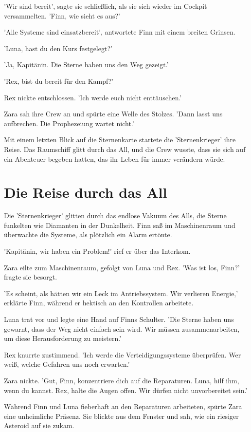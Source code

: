 \documentclass[12pt]{article}
\begin{document}
'Wir sind bereit', sagte sie schließlich, als sie sich wieder im Cockpit versammelten. 'Finn, wie sieht es aus?'

'Alle Systeme sind einsatzbereit', antwortete Finn mit einem breiten Grinsen.

'Luna, hast du den Kurs festgelegt?'

'Ja, Kapitänin. Die Sterne haben uns den Weg gezeigt.'

'Rex, bist du bereit für den Kampf?'

Rex nickte entschlossen. 'Ich werde euch nicht enttäuschen.'

Zara sah ihre Crew an und spürte eine Welle des Stolzes. 'Dann lasst uns aufbrechen. Die Prophezeiung wartet nicht.'

Mit einem letzten Blick auf die Sternenkarte startete die 'Sternenkrieger' ihre Reise. Das Raumschiff glitt durch das All, und die Crew wusste, dass sie sich auf ein Abenteuer begeben hatten, das ihr Leben für immer verändern würde.

\section{ Die Reise durch das All }
 Die 'Sternenkrieger' glitten durch das endlose Vakuum des Alls, die Sterne funkelten wie Diamanten in der Dunkelheit. Finn saß im Maschinenraum und überwachte die Systeme, als plötzlich ein Alarm ertönte.

'Kapitänin, wir haben ein Problem!' rief er über das Interkom.

Zara eilte zum Maschinenraum, gefolgt von Luna und Rex. 'Was ist los, Finn?' fragte sie besorgt.

'Es scheint, als hätten wir ein Leck im Antriebssystem. Wir verlieren Energie,' erklärte Finn, während er hektisch an den Kontrollen arbeitete.

Luna trat vor und legte eine Hand auf Finns Schulter. 'Die Sterne haben uns gewarnt, dass der Weg nicht einfach sein wird. Wir müssen zusammenarbeiten, um diese Herausforderung zu meistern.'

Rex knurrte zustimmend. 'Ich werde die Verteidigungssysteme überprüfen. Wer weiß, welche Gefahren uns noch erwarten.'

Zara nickte. 'Gut, Finn, konzentriere dich auf die Reparaturen. Luna, hilf ihm, wenn du kannst. Rex, halte die Augen offen. Wir dürfen nicht unvorbereitet sein.'

Während Finn und Luna fieberhaft an den Reparaturen arbeiteten, spürte Zara eine unheimliche Präsenz. Sie blickte aus dem Fenster und sah, wie ein riesiger Asteroid auf sie zukam.
\end{document}
